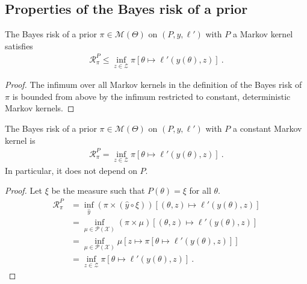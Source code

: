 \subsection{Properties of the Bayes risk of a prior}

\begin{lemma}
  \label{lem:bayesRisk_le_const}
  \mathlibok
  The Bayes risk of a prior $\pi \in \mathcal M(\Theta)$ on $(P, y, \ell')$ with $P$ a Markov kernel satisfies
  \begin{align*}
  \mathcal R^P_\pi \le \inf_{z \in \mathcal Z} \pi\left[ \theta \mapsto \ell'(y(\theta), z) \right]
  \: .
  \end{align*}
\end{lemma}

\begin{proof}\mathlibok
\uses{}
The infimum over all Markov kernels in the definition of the Bayes risk of $\pi$ is bounded from above by the infimum restricted to constant, deterministic Markov kernels.
\end{proof}


\begin{lemma}
  \label{lem:bayesRisk_const}
  \mathlibok
  The Bayes risk of a prior $\pi \in \mathcal M(\Theta)$ on $(P, y, \ell')$ with $P$ a constant Markov kernel is
  \begin{align*}
  \mathcal R^P_\pi
  = \inf_{z \in \mathcal Z} \pi\left[\theta \mapsto \ell'(y(\theta), z)\right]
  \: .
  \end{align*}
  In particular, it does not depend on $P$.
\end{lemma}

\begin{proof}\mathlibok
\uses{}
Let $\xi$ be the measure such that $P(\theta) = \xi$ for all $\theta$.
\begin{align*}
\mathcal R^P_\pi
&= \inf_{\hat{y}}(\pi \times (\hat{y} \circ \xi))\left[(\theta, z)\mapsto \ell'(y(\theta), z)\right]
\\
&= \inf_{\mu \in \mathcal P(\mathcal X)} (\pi \times \mu)\left[(\theta, z)\mapsto \ell'(y(\theta), z)\right]
\\
&= \inf_{\mu \in \mathcal P(\mathcal X)} \mu\left[ z \mapsto \pi\left[\theta \mapsto \ell'(y(\theta), z)\right]\right]
\\
&= \inf_{z \in \mathcal Z} \pi\left[\theta \mapsto \ell'(y(\theta), z)\right]
\: .
\end{align*}

\end{proof}




